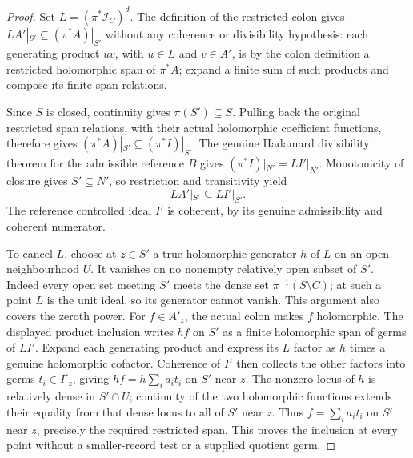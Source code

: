 \begin{proof}
Set $L=(\pi^*\mathcal I_C)^d$. The definition of the restricted colon gives
$LA'|_{S'}\subseteq(\pi^*A)|_{S'}$ without any coherence or divisibility
hypothesis: each generating product $u v$, with $u\in L$ and
$v\in A'$, is by the colon definition a restricted holomorphic span of
$\pi^*A$; expand a finite sum of such products and compose its finite
span relations.

Since $S$ is closed, continuity gives $\pi(S')\subseteq S$.
Pulling back the original restricted span relations, with their actual
holomorphic coefficient functions, therefore gives
$(\pi^*A)|_{S'}\subseteq(\pi^*I)|_{S'}$.
The genuine Hadamard divisibility theorem for the admissible reference
$B$ gives $(\pi^*I)|_{N'}=LI'|_{N'}$. Monotonicity of closure gives
$S'\subseteq N'$, so restriction and transitivity yield
\[
                    LA'|_{S'}\subseteq LI'|_{S'}.
\]
The reference controlled ideal $I'$ is coherent, by its genuine
admissibility and coherent numerator.

To cancel $L$, choose at $z\in S'$ a true holomorphic generator $h$ of
$L$ on an open neighbourhood $U$. It vanishes on no nonempty relatively
open subset of $S'$. Indeed every open set meeting $S'$ meets the dense
set $\pi^{-1}(S\setminus C)$; at such a point $L$ is the unit ideal, so
its generator cannot vanish. This argument also covers the zeroth power.
For $f\in A'_z$, the actual colon makes $f$ holomorphic. The displayed
product inclusion writes $hf$ on $S'$ as a finite holomorphic span of
germs of $LI'$. Expand each generating product and express its $L$
factor as $h$ times a genuine holomorphic cofactor. Coherence of $I'$
then collects the other factors into germs $t_i\in I'_z$, giving
$hf=h\sum_i a_i t_i$ on $S'$ near $z$.
The nonzero locus of $h$ is relatively dense in $S'\cap U$;
continuity of the two holomorphic functions extends their equality
from that dense locus to all of $S'$ near $z$. Thus
$f=\sum_i a_i t_i$ on $S'$ near $z$, precisely the required restricted
span. This proves the inclusion at every point without a smaller-record
test or a supplied quotient germ.
\end{proof}

